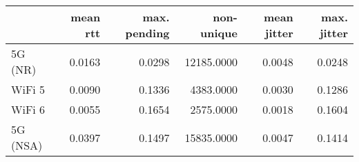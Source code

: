 \begin{tabular}{l|rrrrr}
\rowcolor{gray!50}
 & mean rtt & max. pending & non-unique & mean jitter & max. jitter\\\hline
5G (NR) & 0.0163 & 0.0298 & 12185.0000 & 0.0048 & 0.0248 \\
WiFi 5 & 0.0090 & 0.1336 & 4383.0000 & 0.0030 & 0.1286 \\
WiFi 6 & 0.0055 & 0.1654 & 2575.0000 & 0.0018 & 0.1604 \\
5G (NSA) & 0.0397 & 0.1497 & 15835.0000 & 0.0047 & 0.1414 \\
\end{tabular}
